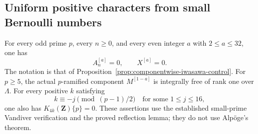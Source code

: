 \subsection{Uniform positive characters from small Bernoulli numbers}
\label{sec:positive-iwasawa-components}

\begin{proposition}
\label{prop:positive-iwasawa-components}
For every odd prime $p$, every $n\geq0$, and every even integer
$a$ with $2\leq a\leq32$, one has
\[
                      A_n^{[a]}=0,
                      \qquad X^{[a]}=0.
 \tag{PC.1}
\]
The notation is that of Proposition~\ref{prop:componentwise-iwasawa-control}.
For $p\geq5$, the actual $p$-ramified component $M^{[1-a]}$
is integrally free of rank one over $\Lambda$.
For every positive $k$ satisfying
\[
       k\equiv-j\pmod{(p-1)/2}
                  \quad\text{for some }1\leq j\leq16,
\]
one also has $K_{4k}(\mathbf Z)\{p\}=0$.
These assertions use the established small-prime Vandiver verification
and the proved reflection lemma; they do not use Alp\"oge's theorem.
\end{proposition}

